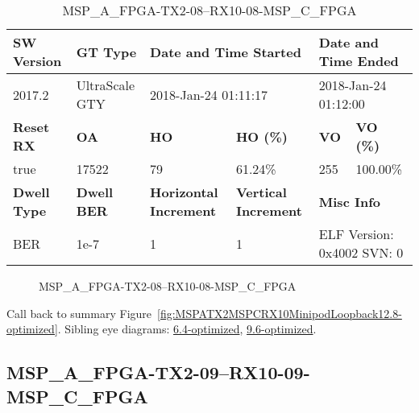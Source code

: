 \begin{table}[h]
\centering
\caption{MSP\_A\_FPGA-TX2-08--RX10-08-MSP\_C\_FPGA}
\label{tab:MSPAFPGATX208RX1008MSPCFPGA12.8-optimized}
\begin{tabular}{@{}|l|l|l|l|l|l|@{}}
\toprule
\textbf{SW Version}                & \textbf{GT Type}   & \multicolumn{2}{l|}{\textbf{Date and Time Started}}            & \multicolumn{2}{l|}{\textbf{Date and Time Ended}}        \\ \midrule
2017.2                       & UltraScale GTY          & \multicolumn{2}{l|}{2018-Jan-24 01:11:17}                   & \multicolumn{2}{l|}{2018-Jan-24 01:12:00}               \\ \midrule
\textbf{Reset RX}                  & \textbf{OA} & \textbf{HO}   & \textbf{HO (\%)} & \textbf{VO} & \textbf{VO (\%)} \\ \midrule
true & 17522        & 79          & 61.24\%        & 255        & 100.00\%       \\ \midrule
\textbf{Dwell Type}                & \textbf{Dwell BER} & \textbf{Horizontal Increment} & \textbf{Vertical Increment}    & \multicolumn{2}{l|}{\textbf{Misc Info}}                  \\ \midrule
BER                            & 1e-7        & 1        & 1           & \multicolumn{2}{l|}{ELF Version: 0x4002 SVN: 0}                         \\ \bottomrule
\end{tabular}
\end{table}

\begin{figure}[h]
\caption{MSP\_A\_FPGA-TX2-08--RX10-08-MSP\_C\_FPGA} \label{fig:MSPAFPGATX208RX1008MSPCFPGA12.8-optimized}
\end{figure}

Call back to summary Figure~\ref{fig:MSPATX2MSPCRX10MinipodLoopback12.8-optimized}.
Sibling eye diagrams: \hyperref[sec:MSPAFPGATX208RX1008MSPCFPGA6.4-optimized]{6.4-optimized}, \hyperref[sec:MSPAFPGATX208RX1008MSPCFPGA9.6-optimized]{9.6-optimized}.

\clearpage
\newpage


\subsection{MSP\_A\_FPGA-TX2-09--RX10-09-MSP\_C\_FPGA}\label{sec:MSPAFPGATX209RX1009MSPCFPGA12.8-optimized}

